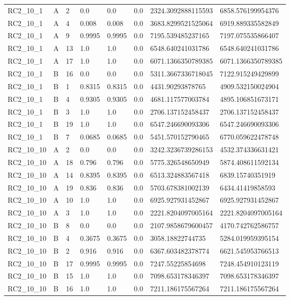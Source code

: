 \begin{tabular}{llllllll}
 RC2\_10\_1 & A & 2 & 0.0 & 0.0 & 0.0 & 2324.3092888115593 & 6858.576199954376 \\
 RC2\_10\_1 & A & 4 & 0.008 & 0.008 & 0.0 & 3683.8299521525064 & 6919.889335582849 \\
 RC2\_10\_1 & A & 9 & 0.9995 & 0.9995 & 0.0 & 7195.539485237165 & 7197.075535866407 \\
 RC2\_10\_1 & A & 13 & 1.0 & 1.0 & 0.0 & 6548.640241031786 & 6548.640241031786 \\
 RC2\_10\_1 & A & 17 & 1.0 & 1.0 & 0.0 & 6071.1366350789385 & 6071.1366350789385 \\
 RC2\_10\_1 & B & 16 & 0.0 & 0.0 & 0.0 & 5311.3667336718045 & 7122.915249429899 \\
 RC2\_10\_1 & B & 1 & 0.8315 & 0.8315 & 0.0 & 4431.90293878765 & 4909.532150024904 \\
 RC2\_10\_1 & B & 4 & 0.9305 & 0.9305 & 0.0 & 4681.117577003784 & 4895.106851673171 \\
 RC2\_10\_1 & B & 3 & 1.0 & 1.0 & 0.0 & 2706.137152458437 & 2706.137152458437 \\
 RC2\_10\_1 & B & 19 & 1.0 & 1.0 & 0.0 & 6547.246690093306 & 6547.246690093306 \\
 RC2\_10\_1 & B & 7 & 0.0685 & 0.0685 & 0.0 & 5451.570152790465 & 6770.059622478748 \\
 RC2\_10\_10 & A & 2 & 0.0 & 0.0 & 0.0 & 3242.3236739286153 & 4532.374336631421 \\
 RC2\_10\_10 & A & 18 & 0.796 & 0.796 & 0.0 & 5775.326548650949 & 5874.408611592134 \\
 RC2\_10\_10 & A & 14 & 0.8395 & 0.8395 & 0.0 & 6513.324883567418 & 6839.15740351919 \\
 RC2\_10\_10 & A & 19 & 0.836 & 0.836 & 0.0 & 5703.678381002139 & 6434.41419858593 \\
 RC2\_10\_10 & A & 10 & 1.0 & 1.0 & 0.0 & 6925.927931452867 & 6925.927931452867 \\
 RC2\_10\_10 & A & 3 & 1.0 & 1.0 & 0.0 & 2221.8204097005164 & 2221.8204097005164 \\
 RC2\_10\_10 & B & 8 & 0.0 & 0.0 & 0.0 & 2107.9858679600457 & 4170.742762586757 \\
 RC2\_10\_10 & B & 4 & 0.3675 & 0.3675 & 0.0 & 3058.18822744735 & 5284.019959395154 \\
 RC2\_10\_10 & B & 2 & 0.916 & 0.916 & 0.0 & 6367.603482378774 & 6621.545953766513 \\
 RC2\_10\_10 & B & 17 & 0.9995 & 0.9995 & 0.0 & 7247.55225854698 & 7248.454910123119 \\
 RC2\_10\_10 & B & 15 & 1.0 & 1.0 & 0.0 & 7098.653178346397 & 7098.653178346397 \\
 RC2\_10\_10 & B & 16 & 1.0 & 1.0 & 0.0 & 7211.186175567264 & 7211.186175567264 \\
 \hline
\end{tabular}
